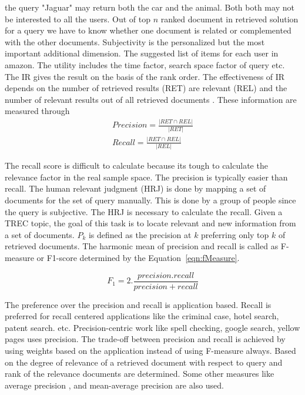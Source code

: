 \documentclass{bmcart}
\begin{document}
the query "Jaguar" may return both the car and the animal. Both both may not be interested to all the users. Out of top $n$ ranked document 	in retrieved solution for a query we have to know whether one document is related or complemented with the other documents. Subjectivity is the personalized but the most important additional dimension. The suggested list of items for
each user in amazon. The utility includes the time factor, search space factor of query etc. The IR gives the result on the basis of the rank order. The effectiveness of IR depends on the number of retrieved results (RET) are relevant (REL) and the number of relevant results out of all retrieved documents \cite{handPrecision}. These information are measured through 
\begin{align*}
Precision = \frac{|RET \cap REL|}{|RET|} \\
Recall = \frac{|RET \cap REL|}{|REL|}
\end{align*}

The recall score is difficult to calculate because its tough to calculate the relevance factor in the real sample space. The precision is typically easier than recall. The human relevant judgment (HRJ) is done by mapping a set of documents for the set of query manually. This is done by a group of people since the query is subjective. The HRJ is necessary to calculate the recall. Given a TREC topic, the goal of this task is to locate relevant and new information from a set of documents. $P_k$ is defined as the precision at $k$ preferring only top $k$ of retrieved documents. The harmonic mean of precision and recall is called as F-measure or F1-score determined by the Equation~\ref{eqn:fMeasure}. 
\begin{center}
\begin{equation}
F_1 = 2. \frac{precision.recall}{precision+recall}
\end{equation}
\label{eqn:fMeasure}
\end{center}

The preference over the precision and recall is application based. Recall is preferred for recall centered applications like the criminal case, hotel search, patent search. etc. Precision-centric work like spell checking, google search, yellow pages uses precision. The trade-off between precision and recall is achieved by using weights based on the application instead of using F-measure  always. Based on the degree of relevance of a retrieved document with respect to query and rank of the relevance documents are determined. Some other measures like average precision , and mean-average precision are also used. 
\end{document}
